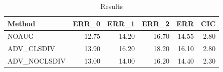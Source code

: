 \begin{table}
\caption{Results}
\label{tab:Results}
\begin{tabular}{lrrrrr}
\toprule
Method & ERR\_0 & ERR\_1 & ERR\_2 & ERR & CIC \\
\midrule
NOAUG & 12.75 & 14.20 & 16.70 & 14.55 & 2.80 \\
ADV\_CLSDIV & 13.90 & 16.20 & 18.20 & 16.10 & 2.80 \\
ADV\_NOCLSDIV & 13.00 & 14.00 & 16.20 & 14.40 & 2.30 \\
\bottomrule
\end{tabular}
\end{table}
